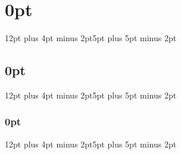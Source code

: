 \documentclass[a4paper,oneside,anyway]{book}%
\begin{document}
\pagestyle{empty}

\tableofcontents \newpage
\listoffigures \newpage
\listoftables \newpage
\pagestyle{fancy}

\DefaultMathsDigits

\usepackage{titlesec}
\titlespacing\section{0pt}{12pt plus 4pt minus 2pt}{5pt plus 5pt minus 2pt}
\titlespacing\subsection{0pt}{12pt plus 4pt minus 2pt}{5pt plus 5pt minus 2pt}
\titlespacing\subsubsection{0pt}{12pt plus 4pt minus 2pt}{5pt plus 5pt minus 2pt}










\begingroup
{}
\renewcommand{\baselinestretch}{1.1} 
\pagestyle{empty}
{


}
\endgroup



\end{document}
